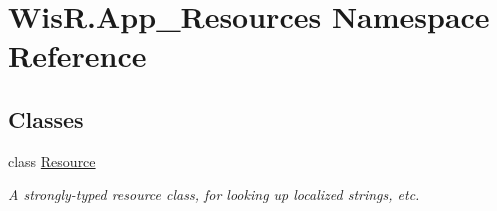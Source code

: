 \hypertarget{namespace_wis_r_1_1_app___resources}{}\section{Wis\+R.\+App\+\_\+\+Resources Namespace Reference}
\label{namespace_wis_r_1_1_app___resources}
\subsection*{Classes}
\begin{DoxyCompactItemize}
\item 
class \hyperlink{class_wis_r_1_1_app___resources_1_1_resource}{Resource}
\begin{DoxyCompactList}\small\item\em A strongly-\/typed resource class, for looking up localized strings, etc. \end{DoxyCompactList}\end{DoxyCompactItemize}
